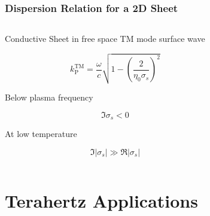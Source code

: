 \documentclass[10pt]{beamer}
\renewcommand{\O}{\omega}  %
\begin{document}
\begin{frame}
    \frametitle{Dispersion Relation for a 2D Sheet}
    \begin{columns}[T] %
        \begin{column}{.5\textwidth}
            \begin{outline}[itemize]
                \1 Conductive Sheet in free space
                \1 TM mode surface wave
            \end{outline}
            \begin{equation} \nonumber
                k^{\mathrm{TM}}_{\mathrm P} = \frac{\O}{c} \sqrt{1 - \left(\frac{2}{\eta_0 \sigma_s}\right)^2}
                \label{eq:TM_pole}%
            \end{equation}
            \begin{outline}[itemize]
                \1 Below plasma frequency
            \end{outline}
            \begin{equation} \nonumber
                \Im \sigma_s < 0
                \label{eq:2deg_surface_wave}%
            \end{equation}%
            \begin{outline}[itemize]
                \1 At low temperature
            \end{outline}%
            \begin{equation} \nonumber
                \Im |\sigma_s| \gg \Re |\sigma_s|
                \label{eq:2deg_low_loss}
            \end{equation}
        \end{column}
        \begin{column}[T]{.45\textwidth}
            \centering
            \begin{figure}

            \end{figure}
        \end{column}
    \end{columns}
\end{frame}

\section{Terahertz Applications}
\end{document}
